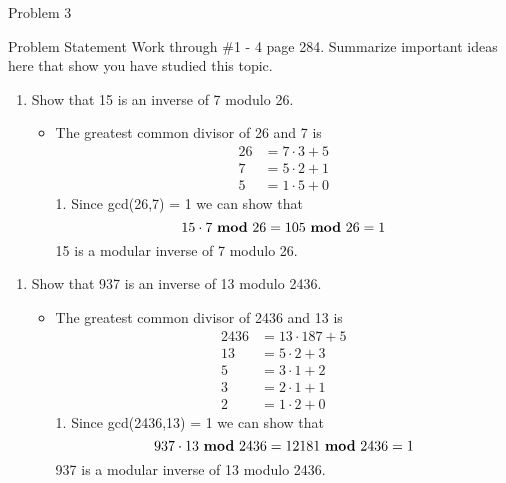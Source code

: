\begin{problem}{Problem 3}
    \begin{statement}{Problem Statement}
        Work through \#1 - 4 page 284. Summarize important ideas here that show you have studied this topic.
    \end{statement}

    \begin{highlight}[Solution - \# 1]
        \begin{enumerate}
            \item Show that 15 is an inverse of 7 modulo 26.
            \begin{itemize}
                \item The greatest common divisor of 26 and 7 is
                \begin{align*}
                    26 & = 7 \cdot 3 + 5 \\
                    7 & = 5 \cdot 2 + 1 \\
                    5 & = 1 \cdot 5 + 0
                \end{align*}
                1. Since gcd(26,7) = 1 we can show that
                \begin{equation*}
                    15 \cdot 7 \text{ \textbf{mod} } 26 = 105 \text{ \textbf{mod} } 26 = 1
                \end{equation*}
                15 is a modular inverse of 7 modulo 26.
            \end{itemize}
        \end{enumerate}
    \end{highlight}

    \begin{highlight}[Solution - \# 2]
        \begin{enumerate}[start = 2]
            \item Show that 937 is an inverse of 13 modulo 2436.
            \begin{itemize}
                \item The greatest common divisor of 2436 and 13 is
                \begin{align*}
                    2436 & = 13 \cdot 187 + 5 \\
                    13 & = 5 \cdot 2 + 3 \\
                    5 & = 3 \cdot 1 + 2 \\
                    3 & = 2 \cdot 1 + 1 \\
                    2 & = 1 \cdot 2 + 0
                \end{align*}
                1. Since gcd(2436,13) = 1 we can show that
                \begin{equation*}
                    937 \cdot 13 \text{ \textbf{mod} } 2436 = 12181 \text{ \textbf{mod} } 2436 = 1
                \end{equation*}
                937 is a modular inverse of 13 modulo 2436.
            \end{itemize}
        \end{enumerate}
    \end{highlight}


\end{problem}
